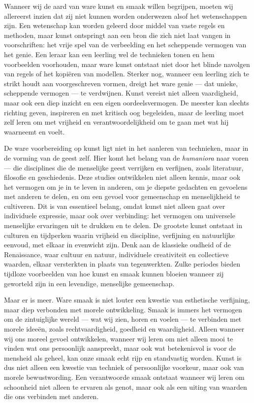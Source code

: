\begin{mdframed}[leftmargin=0pt,rightmargin=0pt,backgroundcolor=blue!6,linecolor=white,innertopmargin=6pt,innerbottommargin=6pt]

Wanneer wij de aard van ware kunst en smaak willen begrijpen, moeten wij allereerst inzien dat zij niet kunnen worden onderwezen alsof het wetenschappen zijn. Een wetenschap kan worden geleerd door middel van vaste regels en methoden, maar kunst ontspringt aan een bron die zich niet laat vangen in voorschriften: het vrije spel van de verbeelding en het scheppende vermogen van het genie. Een leraar kan een leerling wel de technieken tonen en hem voorbeelden voorhouden, maar ware kunst ontstaat niet door het blinde navolgen van regels of het kopiëren van modellen. Sterker nog, wanneer een leerling zich te strikt houdt aan voorgeschreven vormen, dreigt het ware genie — dat unieke, scheppende vermogen — te verdwijnen. Kunst vereist niet alleen vaardigheid, maar ook een diep inzicht en een eigen oordeelsvermogen. De meester kan slechts richting geven, inspireren en met kritisch oog begeleiden, maar de leerling moet zelf leren om met vrijheid en verantwoordelijkheid om te gaan met wat hij waarneemt en voelt.

De ware voorbereiding op kunst ligt niet in het aanleren van technieken, maar in de vorming van de geest zelf. Hier komt het belang van de \textit{humaniora} naar voren — die disciplines die de menselijke geest verrijken en verfijnen, zoals literatuur, filosofie en geschiedenis. Deze studies ontwikkelen niet alleen kennis, maar ook het vermogen om je in te leven in anderen, om je diepste gedachten en gevoelens met anderen te delen, en om een gevoel voor gemeenschap en menselijkheid te cultiveren. Dit is van essentieel belang, omdat kunst niet alleen gaat over individuele expressie, maar ook over verbinding: het vermogen om universele menselijke ervaringen uit te drukken en te delen. De grootste kunst ontstaat in culturen en tijdperken waarin vrijheid en discipline, verfijning en natuurlijke eenvoud, met elkaar in evenwicht zijn. Denk aan de klassieke oudheid of de Renaissance, waar cultuur en natuur, individuele creativiteit en collectieve waarden, elkaar versterkten in plaats van tegenwerkten. Zulke periodes bieden tijdloze voorbeelden van hoe kunst en smaak kunnen bloeien wanneer zij geworteld zijn in een levendige, menselijke gemeenschap.

Maar er is meer. Ware smaak is niet louter een kwestie van esthetische verfijning, maar diep verbonden met morele ontwikkeling. Smaak is immers het vermogen om de zintuiglijke wereld — wat wij zien, horen en voelen — te verbinden met morele ideeën, zoals rechtvaardigheid, goedheid en waardigheid. Alleen wanneer wij ons moreel gevoel ontwikkelen, wanneer wij leren om niet alleen mooi te vinden wat ons persoonlijk aanspreekt, maar ook wat betekenisvol is voor de mensheid als geheel, kan onze smaak echt rijp en standvastig worden. Kunst is dus niet alleen een kwestie van techniek of persoonlijke voorkeur, maar ook van morele bewustwording. Een verantwoorde smaak ontstaat wanneer wij leren om schoonheid niet alleen te ervaren als genot, maar ook als een uiting van waarden die ons verbinden met anderen.


\end{mdframed}
